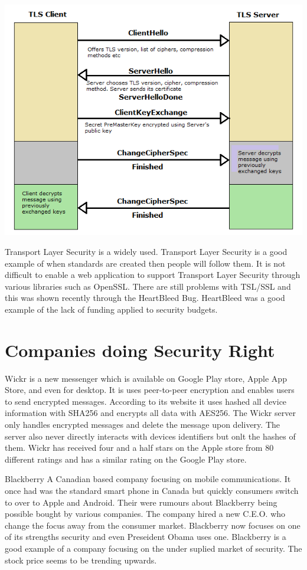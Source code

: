 \documentclass[12pt]{article}
\begin{document}
\includegraphics{tls-handshake}
 
 Transport Layer Security is a widely used. Transport Layer Security is a good example of when standards are created then people will follow them. It is not difficult to enable a web application to support Transport Layer Security through various libraries such as OpenSSL. There are still problems with TSL/SSL and this was shown recently through the HeartBleed Bug. HeartBleed was a good example of the lack of funding applied to security budgets.

\section{Companies doing Security Right}\label{sec:real-life}
Wickr is a new messenger which is available on Google Play store, Apple App Store, and even for desktop. It is uses peer-to-peer encryption and enables users to send encrypted messages.  According to its website it uses hashed all device information with SHA256 and encrypts all data with AES256. The Wickr server only handles encrypted messages and delete the message upon delivery. The server also never directly interacts with devices identifiers but onlt the hashes of them. Wickr has received four and a half stars on the Apple store from 80 different ratings and has a similar rating on the Google Play store. 

Blackberry
A Canadian based company focusing on mobile communications. It once had was the standard smart phone in Canada but quickly consumers switch to over to Apple and Android. Their were rumours about Blackberry being possible bought by various companies. The company hired a new C.E.O. who change the focus away from the consumer market. Blackberry now focuses on one of its strengths security and even Preseident Obama uses one.\cite{Marks} Blackberry is a good example of a company focusing on the under suplied market of security. The stock price seems to be trending upwards.
\end{document}
